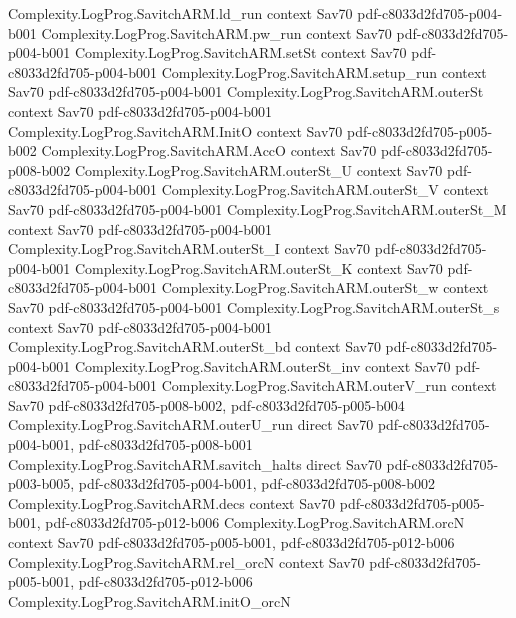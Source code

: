 \begin{theorem}
\proofstep
  {Complexity.LogProg.SavitchARM.ld_run}
  {context}
  {Sav70}
  {pdf-c8033d2fd705-p004-b001}
\proofstep
  {Complexity.LogProg.SavitchARM.pw_run}
  {context}
  {Sav70}
  {pdf-c8033d2fd705-p004-b001}
\proofstep
  {Complexity.LogProg.SavitchARM.setSt}
  {context}
  {Sav70}
  {pdf-c8033d2fd705-p004-b001}
\proofstep
  {Complexity.LogProg.SavitchARM.setup_run}
  {context}
  {Sav70}
  {pdf-c8033d2fd705-p004-b001}
\proofstep
  {Complexity.LogProg.SavitchARM.outerSt}
  {context}
  {Sav70}
  {pdf-c8033d2fd705-p004-b001}
\proofstep
  {Complexity.LogProg.SavitchARM.InitO}
  {context}
  {Sav70}
  {pdf-c8033d2fd705-p005-b002}
\proofstep
  {Complexity.LogProg.SavitchARM.AccO}
  {context}
  {Sav70}
  {pdf-c8033d2fd705-p008-b002}
\proofstep
  {Complexity.LogProg.SavitchARM.outerSt_U}
  {context}
  {Sav70}
  {pdf-c8033d2fd705-p004-b001}
\proofstep
  {Complexity.LogProg.SavitchARM.outerSt_V}
  {context}
  {Sav70}
  {pdf-c8033d2fd705-p004-b001}
\proofstep
  {Complexity.LogProg.SavitchARM.outerSt_M}
  {context}
  {Sav70}
  {pdf-c8033d2fd705-p004-b001}
\proofstep
  {Complexity.LogProg.SavitchARM.outerSt_I}
  {context}
  {Sav70}
  {pdf-c8033d2fd705-p004-b001}
\proofstep
  {Complexity.LogProg.SavitchARM.outerSt_K}
  {context}
  {Sav70}
  {pdf-c8033d2fd705-p004-b001}
\proofstep
  {Complexity.LogProg.SavitchARM.outerSt_w}
  {context}
  {Sav70}
  {pdf-c8033d2fd705-p004-b001}
\proofstep
  {Complexity.LogProg.SavitchARM.outerSt_s}
  {context}
  {Sav70}
  {pdf-c8033d2fd705-p004-b001}
\proofstep
  {Complexity.LogProg.SavitchARM.outerSt_bd}
  {context}
  {Sav70}
  {pdf-c8033d2fd705-p004-b001}
\proofstep
  {Complexity.LogProg.SavitchARM.outerSt_inv}
  {context}
  {Sav70}
  {pdf-c8033d2fd705-p004-b001}
\proofstep
  {Complexity.LogProg.SavitchARM.outerV_run}
  {context}
  {Sav70}
  {pdf-c8033d2fd705-p008-b002,
    pdf-c8033d2fd705-p005-b004}
\proofstep
  {Complexity.LogProg.SavitchARM.outerU_run}
  {direct}
  {Sav70}
  {pdf-c8033d2fd705-p004-b001,
    pdf-c8033d2fd705-p008-b001}
\proofstep
  {Complexity.LogProg.SavitchARM.savitch_halts}
  {direct}
  {Sav70}
  {pdf-c8033d2fd705-p003-b005,
    pdf-c8033d2fd705-p004-b001,
    pdf-c8033d2fd705-p008-b002}
\proofstep
  {Complexity.LogProg.SavitchARM.decs}
  {context}
  {Sav70}
  {pdf-c8033d2fd705-p005-b001,
    pdf-c8033d2fd705-p012-b006}
\proofstep
  {Complexity.LogProg.SavitchARM.orcN}
  {context}
  {Sav70}
  {pdf-c8033d2fd705-p005-b001,
    pdf-c8033d2fd705-p012-b006}
\proofstep
  {Complexity.LogProg.SavitchARM.rel_orcN}
  {context}
  {Sav70}
  {pdf-c8033d2fd705-p005-b001,
    pdf-c8033d2fd705-p012-b006}
\proofstep
  {Complexity.LogProg.SavitchARM.initO_orcN}

\end{theorem}
